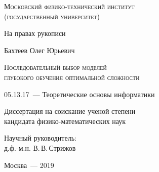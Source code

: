 \thispagestyle{empty}


\begin{titlepage}
\begin{center}
\textsc{Московский физико-технический институт \\ (государственный университет)}\\
\end{center}
\vspace{1.5cm}
\begin{flushright}
{На правах рукописи}
\end{flushright}
\vspace{1.5cm}
\begin{center}
{Бахтеев Олег Юрьевич}
\par
\vspace{2cm}
\textsc{Последовательный выбор моделей \\глубокого обучения оптимальной сложности}
\par
\vspace{2cm}
{05.13.17~--- Теоретические основы информатики}
\par
\vspace{2cm}
{Диссертация на соискание ученой степени\\
кандидата физико-математических наук}
\end{center}
\vspace{2cm}
\hfill\parbox{8,4cm}{Научный руководитель:
\\д.ф.-м.н. В.\,В.\,Стрижов}
\par
\vspace{3.5cm}
\begin{center}
{Москва~--- 2019}
\end{center}
\end{titlepage}



\newpage{}
